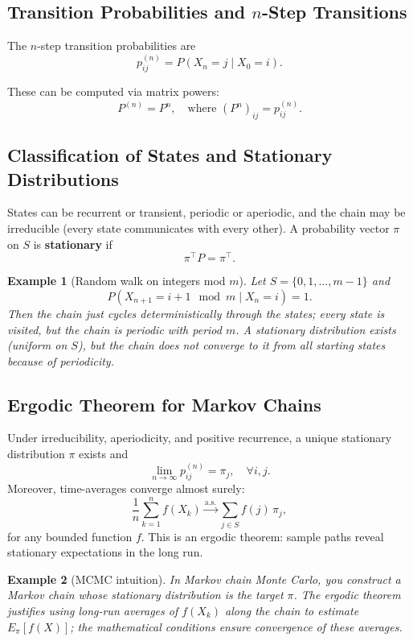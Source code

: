 \documentclass[11pt,a4paper]{article}
\newtheorem{example}{Example}[section]
\numberwithin{equation}{section}
\begin{document}
\subsection{Transition Probabilities and $n$-Step Transitions}

The $n$-step transition probabilities are
\[
p_{ij}^{(n)} = P(X_n=j \mid X_0=i).
\]

These can be computed via matrix powers:
\[
P^{(n)} = P^n,\quad\text{where } (P^n)_{ij} = p_{ij}^{(n)}.
\]

\subsection{Classification of States and Stationary Distributions}

States can be recurrent or transient, periodic or aperiodic, and the chain may be irreducible (every state communicates with every other). 
A probability vector $\pi$ on $S$ is \textbf{stationary} if
\[
\pi^\top P = \pi^\top.
\]

\begin{example}[Random walk on integers mod $m$]
Let $S=\{0,1,\dots,m-1\}$ and
\[
P(X_{n+1} = i+1 \mod m \mid X_n=i) = 1.
\]
Then the chain just cycles deterministically through the states; every state is visited, but the chain is periodic with period $m$. 
A stationary distribution exists (uniform on $S$), but the chain does not converge to it from all starting states because of periodicity.

\end{example}

\subsection{Ergodic Theorem for Markov Chains}

Under irreducibility, aperiodicity, and positive recurrence, a unique stationary distribution $\pi$ exists and
\[
\lim_{n\to\infty} p_{ij}^{(n)} = \pi_j,\quad \forall i,j.
\]
Moreover, time-averages converge almost surely:
\[
\frac{1}{n}\sum_{k=1}^n f(X_k) \xrightarrow{\text{a.s.}} \sum_{j\in S} f(j)\,\pi_j,
\]
for any bounded function $f$. 
This is an ergodic theorem: sample paths reveal stationary expectations in the long run.

\begin{example}[MCMC intuition]
In Markov chain Monte Carlo, you construct a Markov chain whose stationary distribution is the target $\pi$. 
The ergodic theorem justifies using long-run averages of $f(X_k)$ along the chain to estimate $E_\pi[f(X)]$; the mathematical conditions ensure convergence of these averages.

\end{example}
\end{document}
